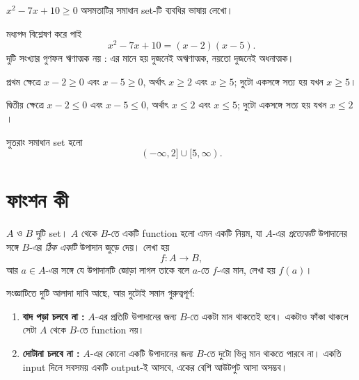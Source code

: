 \documentclass[11pt]{article}
\begin{document}
\begin{example}
$x^2 - 7x + 10 \geq 0$ অসমতাটির সমাধান set-টি ব্যবধির ভাষায় লেখো।
\end{example}

\begin{solbox}
মধ্যপদ বিশ্লেষণ করে পাই
\[
  x^2 - 7x + 10 = (x - 2)(x - 5).
\]
দুটি সংখ্যার গুণফল ঋণাত্মক নয় : এর মানে হয় দুজনেই অঋণাত্মক, নয়তো দুজনেই
অধনাত্মক।

প্রথম ক্ষেত্রে $x - 2 \geq 0$ এবং $x - 5 \geq 0$, অর্থাৎ $x \geq 2$ এবং
$x \geq 5$; দুটো একসঙ্গে সত্য হয় যখন $x \geq 5$।

দ্বিতীয় ক্ষেত্রে $x - 2 \leq 0$ এবং $x - 5 \leq 0$, অর্থাৎ $x \leq 2$ এবং
$x \leq 5$; দুটো একসঙ্গে সত্য হয় যখন $x \leq 2$।

সুতরাং সমাধান set হলো
\[
  (-\infty, 2] \cup [5, \infty).
\]
\end{solbox}

\section{ফাংশন কী}

\begin{idea}[ফাংশন]
$A$ ও $B$ দুটি set। $A$ থেকে $B$-তে একটি function হলো এমন একটি নিয়ম, যা
$A$-এর \emph{প্রত্যেকটি} উপাদানের সঙ্গে $B$-এর \emph{ঠিক একটি} উপাদান জুড়ে
দেয়। লেখা হয়
\[
  f \colon A \to B,
\]
আর $a \in A$-এর সঙ্গে যে উপাদানটি জোড়া লাগল তাকে বলে $a$-তে $f$-এর মান,
লেখা হয় $f(a)$।

সংজ্ঞাটিতে দুটি আলাদা দাবি আছে, আর দুটোই সমান গুরুত্বপূর্ণ:

\begin{enumerate}
  \item \textbf{বাদ পড়া চলবে না :} $A$-এর প্রতিটি উপাদানের জন্য $B$-তে একটা মান
        থাকতেই হবে। একটাও ফাঁকা থাকলে সেটা $A$ থেকে $B$-তে function নয়।
  \item \textbf{দোটানা চলবে না :} $A$-এর কোনো একটি উপাদানের জন্য $B$-তে দুটো ভিন্ন মান
        থাকতে পারবে না। একতি input দিলে সবসময় একটি output-ই আসবে, একের বেশি আউটপুট আসা অসম্ভব।
\end{enumerate}
\end{idea}

\begin{center}
\end{center}
\end{document}
